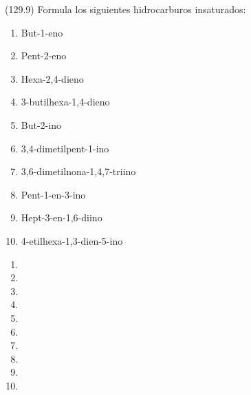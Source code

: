   \begin{exercise}[
      tags    = {},
      topics  = {química, química orgánica, orgánica},
      source  = {FQ 1B MGH 2016, p129, e9},
    ]
    (129.9) Formula los siguientes hidrocarburos insaturados:
    \begin{enumerate}
      \item But-1-eno
      \item Pent-2-eno
      \item Hexa-2,4-dieno
      \item 3-butilhexa-1,4-dieno
      \item But-2-ino
      \item 3,4-dimetilpent-1-ino
      \item 3,6-dimetilnona-1,4,7-triino
      \item Pent-1-en-3-ino
      \item Hept-3-en-1,6-diino
      \item 4-etilhexa-1,3-dien-5-ino
    \end{enumerate}
  \end{exercise}

  \begin{solution}
    \begin{enumerate}
      \item {}
      \item {}
      \item {}
      \item {}
      \item {}
      \item {}
      \item {}
      \item {}
      \item {}
      \item {}
    \end{enumerate}
  \end{solution}




